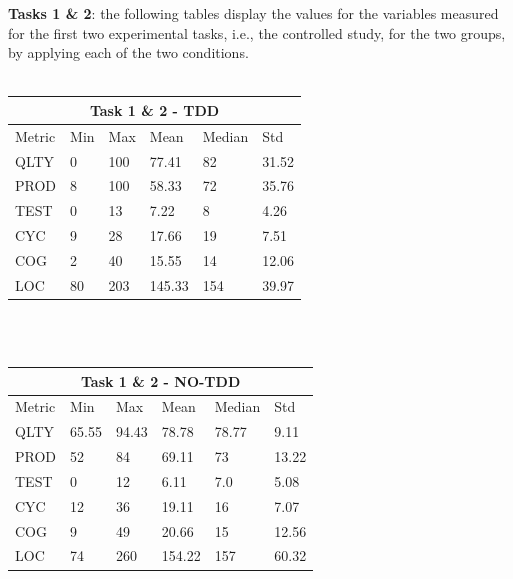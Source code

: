 \textbf{Tasks 1 \& 2}: the following tables display the values for the variables measured for the first two experimental tasks, i.e., the controlled study, for the two groups, by applying each of the two conditions.
\\ \  \\
\noindent
\begin{tabular}{ |p{2cm}||p{1.6cm}|p{1.6cm}|p{1.6cm}|p{1.6cm}|p{1.6cm}|}
    \hline
        \multicolumn{6}{|c|}{Task 1 \& 2 - TDD} \\
    \hline
        Metric & Min & Max & Mean & Median & Std\\
    \hline
        QLTY & 0 & 100 & 77.41 & 82 & 31.52 \\
        PROD & 8 & 100 & 58.33 & 72 & 35.76 \\
        TEST & 0 & 13 & 7.22 & 8 & 4.26 \\
        CYC & 9 & 28 & 17.66 & 19 & 7.51 \\
        COG & 2 & 40 & 15.55 & 14 & 12.06 \\
        LOC & 80 & 203 & 145.33 & 154 & 39.97 \\
    \hline
\end{tabular}
\\ \  \\
\noindent
\begin{tabular}{ |p{2cm}||p{1.6cm}|p{1.6cm}|p{1.6cm}|p{1.6cm}|p{1.6cm}|}
    \hline
        \multicolumn{6}{|c|}{Task 1 \& 2 - NO-TDD} \\
    \hline
        Metric & Min & Max & Mean & Median & Std\\
    \hline
        QLTY & 65.55 & 94.43 & 78.78 & 78.77 & 9.11 \\
        PROD & 52 & 84 & 69.11 & 73 & 13.22 \\
        TEST & 0 & 12 & 6.11 & 7.0 & 5.08 \\
        CYC & 12 & 36 & 19.11 & 16 & 7.07 \\
        COG & 9 & 49 & 20.66 & 15 & 12.56 \\
        LOC & 74 & 260 & 154.22 & 157 & 60.32 \\
    \hline
\end{tabular}
\\ \  \\


